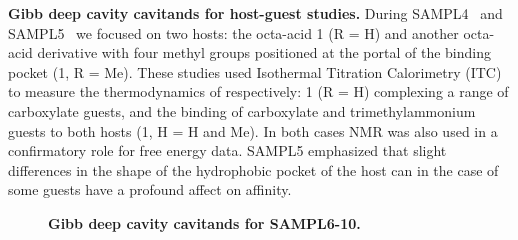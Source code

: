 \documentclass[11pt]{article}
\begin{document}


{\bf Gibb deep cavity cavitands for host-guest studies.} 
During SAMPL4~\cite{gibb_binding_2013} and SAMPL5~\cite{sullivan_binding_2016} we focused on two hosts: the octa-acid 1 (R = H) and another octa-acid derivative with four methyl groups positioned at the portal of the binding pocket (1, R = Me).  These studies used Isothermal Titration Calorimetry (ITC) to measure the thermodynamics of respectively: 1 (R = H) complexing a range of carboxylate guests, and the binding of carboxylate and trimethylammonium guests to both hosts (1, H = H and Me).  In both cases NMR was also used in a confirmatory role for free energy data.  SAMPL5 emphasized that slight differences in the shape of the hydrophobic pocket of the host can in the case of some guests have a profound affect on affinity.

\begin{figure}[h]
\begin{centering}

\vspace{0.1in}
\caption{\footnotesize {\bf Gibb deep cavity cavitands for SAMPL6-10.}
\label{figure:gdccs}}
\end{centering}
\end{figure}
\end{document}
